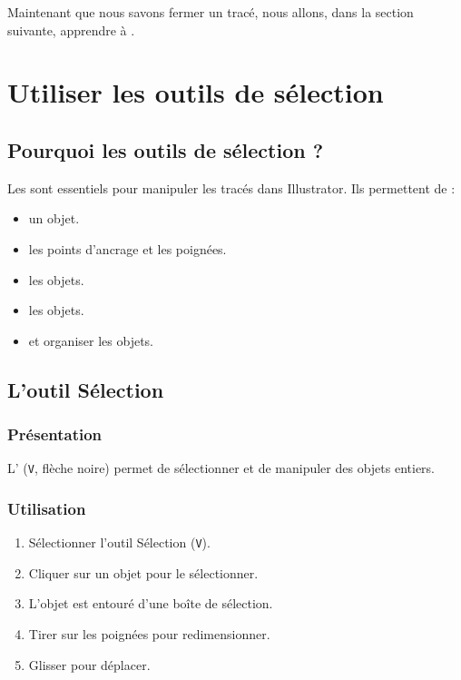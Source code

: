 Maintenant que nous savons fermer un tracé, nous allons, dans la section suivante, apprendre à .

\section{Utiliser les outils de sélection}

\subsection{Pourquoi les outils de sélection ?}

Les  sont essentiels pour manipuler les tracés dans Illustrator. Ils permettent de :

\begin{itemize}
    \item {} un objet.
    \item {} les points d'ancrage et les poignées.
    \item {} les objets.
    \item {} les objets.
    \item {} et organiser les objets.
\end{itemize}

\subsection{L'outil Sélection}

\subsubsection{Présentation}

L' (\texttt{V}, flèche noire) permet de sélectionner et de manipuler des objets entiers.

\subsubsection{Utilisation}

\begin{enumerate}
    \item Sélectionner l'outil Sélection (\texttt{V}).
    \item Cliquer sur un objet pour le sélectionner.
    \item L'objet est entouré d'une boîte de sélection.
    \item Tirer sur les poignées pour redimensionner.
    \item Glisser pour déplacer.
\end{enumerate}

